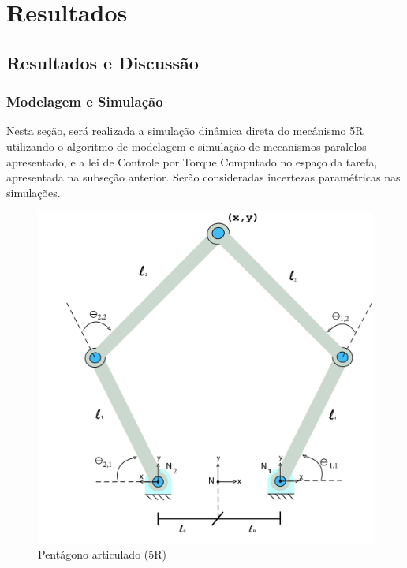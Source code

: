 \documentclass[]{politex}
\begin{document}
\part{Resultados}

\chapter{Resultados e Discussão}


\section{Modelagem e Simulação}

Nesta seção, será realizada a simulação dinâmica direta do mecânismo 5R utilizando o algoritmo de modelagem e simulação de mecanismos paralelos apresentado, e a lei de Controle por Torque Computado no espaço da tarefa, apresentada na subseção anterior. Serão consideradas incertezas paramétricas nas simulações.

\begin{figure}[h]
	\centering
	\includegraphics[scale=0.10]{../figures/5Rscan.jpg}  
	\caption{Pentágono articulado (5R)}
	\label{fig:5R}
\end{figure}
\end{document}
